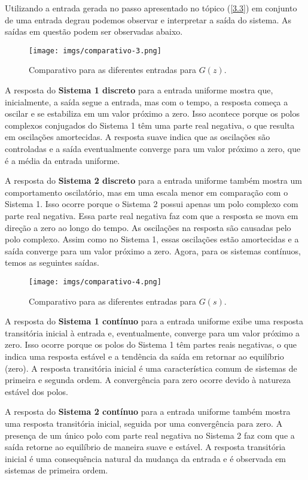 \documentclass[a4paper,12pt]{article}
\begin{document}
Utilizando a entrada gerada no passo apresentado no tópico (\ref{3.3}) em conjunto de uma entrada degrau podemos observar e interpretar a saída do sistema. As saídas em questão podem ser observadas abaixo. 

\begin{figure}[h!]\label{fig4}
  \centering
  \texttt{[image: imgs/comparativo-3.png]}
  \caption{Comparativo para as diferentes entradas para $G(z)$.}
\end{figure}

A resposta do \textbf{Sistema 1 discreto} para a entrada uniforme mostra que, inicialmente, a saída segue a entrada, mas com o tempo, a resposta começa a oscilar e se estabiliza em um valor próximo a zero. Isso acontece porque os polos complexos conjugados do Sistema 1 têm uma parte real negativa, o que resulta em oscilações amortecidas. A resposta suave indica que as oscilações são controladas e a saída eventualmente converge para um valor próximo a zero, que é a média da entrada uniforme.

A resposta do \textbf{Sistema 2 discreto} para a entrada uniforme também mostra um comportamento oscilatório, mas em uma escala menor em comparação com o Sistema 1. Isso ocorre porque o Sistema 2 possui apenas um polo complexo com parte real negativa. Essa parte real negativa faz com que a resposta se mova em direção a zero ao longo do tempo. As oscilações na resposta são causadas pelo polo complexo. Assim como no Sistema 1, essas oscilações estão amortecidas e a saída converge para um valor próximo a zero. Agora, para os sistemas contínuos, temos as seguintes saídas.

\begin{figure}[h!]\label{fig5}
  \centering
  \texttt{[image: imgs/comparativo-4.png]}
  \caption{Comparativo para as diferentes entradas para $G(s)$.}
\end{figure}

A resposta do \textbf{Sistema 1 contínuo} para a entrada uniforme exibe uma resposta transitória inicial à entrada e, eventualmente, converge para um valor próximo a zero. Isso ocorre porque os polos do Sistema 1 têm partes reais negativas, o que indica uma resposta estável e a tendência da saída em retornar ao equilíbrio (zero). A resposta transitória inicial é uma característica comum de sistemas de primeira e segunda ordem. A convergência para zero ocorre devido à natureza estável dos polos.

A resposta do \textbf{Sistema 2 contínuo} para a entrada uniforme também mostra uma resposta transitória inicial, seguida por uma convergência para zero. A presença de um único polo com parte real negativa no Sistema 2 faz com que a saída retorne ao equilíbrio de maneira suave e estável. A resposta transitória inicial é uma consequência natural da mudança da entrada e é observada em sistemas de primeira ordem.
\end{document}
